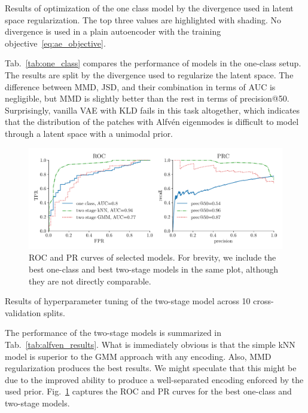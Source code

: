 \begin{table}
  \centering
  
  \caption{Results of optimization of the one class model by the divergence used in latent space regularization. The top three values are highlighted with shading. No divergence is used in a plain autoencoder with the training objective~\eqref{eq:ae_objective}.}
  \label{tab:one_class}
\end{table}

Tab.~\ref{tab:one_class} compares the performance of models in the one-class setup. The results are split by the divergence used to regularize the latent space. The difference between MMD, JSD, and their combination in terms of AUC is negligible, but MMD is slightly better than the rest in terms of precision@50. Surprisingly, vanilla VAE with KLD fails in this task altogether, which indicates that the distribution of the patches with Alfvén eigenmodes is difficult to model through a latent space with a unimodal prior.

\begin{figure}
\begin{centering}
\includegraphics[scale=0.6]{data/chapter_alfven/roc_prc.pdf}
\end{centering}
\caption{ROC and PR curves of selected models. For brevity, we include the best one-class and best two-stage models in the same plot, although they are not directly comparable.}
\label{fig:roc_prc}
\end{figure}

\begin{table}
\centering

\caption{Results of hyperparameter tuning of the two-stage model across 10 cross-validation splits.}
\label{tab:alfven_results}
\end{table}

The performance of the two-stage models is summarized in Tab.~\ref{tab:alfven_results}. What is immediately obvious is that the simple kNN model is superior to the GMM approach with any encoding. Also, MMD regularization produces the best results. We might speculate that this might be due to the improved ability to produce a well-separated encoding enforced by the used prior. Fig.~\ref{fig:roc_prc} captures the ROC and PR curves for the best one-class and two-stage models.

